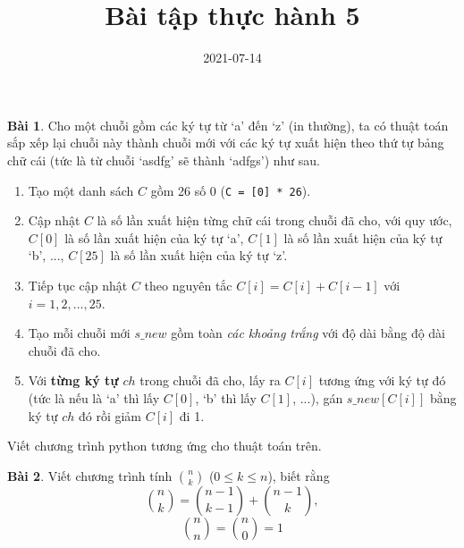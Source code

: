 \documentclass[12pt, a4paper]{article}
\title{Bài tập thực hành 5}
\date{2021-07-14}
\author{}
\begin{document}
    \onehalfspacing
    \maketitle
	\textbf{Bài 1}. Cho một chuỗi gồm các ký tự từ `a' đến `z' (in thường), 
	ta có thuật toán sắp xếp lại chuỗi này thành chuỗi mới với các ký tự xuất hiện theo thứ tự bảng chữ cái
	(tức là từ chuỗi `asdfg' sẽ thành `adfgs') như sau.
	\begin{enumerate}
		\item Tạo một danh sách $C$ gồm 26 số 0 (\texttt{C = [0] * 26}). 
		\item Cập nhật $C$ là số lần xuất hiện từng chữ cái trong chuỗi đã cho, với quy ước, 
		$C[0]$ là số lần xuất hiện của ký tự `a',
		$C[1]$ là số lần xuất hiện của ký tự `b',
		..., $C[25]$ là số lần xuất hiện của ký tự `z'.
		\item Tiếp tục cập nhật $C$ theo nguyên tắc $C[i] = C[i] + C[i-1]$ với $i = 1, 2, ..., 25$.
		\item Tạo mỗi chuỗi mới $s\_new$ gồm toàn \textit{các khoảng trắng} với độ dài bằng độ dài chuỗi đã cho.
		\item Với \textbf{từng ký tự} $ch$ trong chuỗi đã cho, lấy ra $C[i]$ tương ứng với ký tự đó 
		(tức là nếu là `a' thì lấy $C[0]$, `b' thì lấy $C[1]$, ...), gán $s\_new[C[i]]$ bằng ký tự $ch$ đó
		rồi giảm $C[i]$ đi 1.
	\end{enumerate}
	Viết chương trình python tương ứng cho thuật toán trên.

	\textbf{Bài 2}. Viết chương trình tính $\binom{n}{k}$ ($0 \leq k \leq n$), biết rằng
	$$\binom{n}{k} = \binom{n-1}{k-1} + \binom{n-1}{k},$$
	$$\binom{n}{n} = \binom{n}{0} = 1$$
\end{document}
